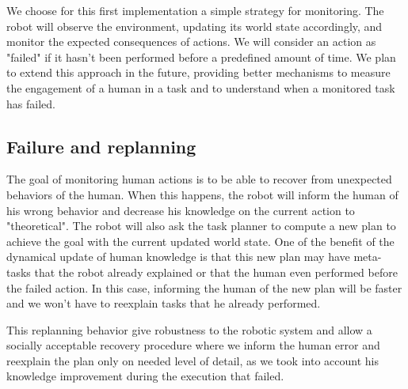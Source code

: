\documentclass{llncs}
\begin{document}
We choose for this first implementation a simple strategy for monitoring. The robot will observe the environment, updating its world state accordingly, and monitor the expected consequences of actions. We will consider an action as "failed" if it hasn't been performed before a predefined amount of time. We plan to extend this approach in the future, providing better mechanisms to measure the engagement of a human in a task and to understand when a monitored task has failed.


\subsection{Failure and replanning}

The goal of monitoring human actions is to be able to recover from unexpected behaviors of the human. When this happens, the robot will inform the human of his wrong behavior and decrease his knowledge on the current action to "theoretical". 
The robot will also ask the task planner to compute a new plan to achieve the goal with the current updated world state.
One of the benefit of the dynamical update of human knowledge is that this new plan may have meta-tasks that the robot already explained or that the human even performed before the failed action. In this case, informing the human of the new plan will be faster and we won't have to reexplain tasks that he already performed.

This replanning behavior give robustness to the robotic system and allow a socially acceptable recovery procedure where we inform the human error and reexplain the plan only on needed level of detail, as we took into account his knowledge improvement during the execution that failed.



\end{document}
